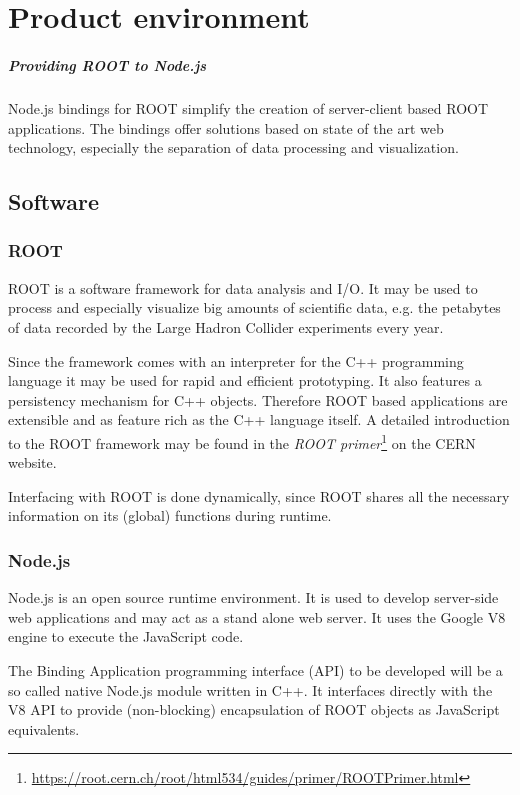 \chapter{Product environment}

\paragraph{Providing ROOT to Node.js}
Node.js bindings for ROOT simplify the creation of server-client based ROOT applications. The bindings offer solutions based on state of the art web technology, especially the separation of data 
processing and visualization.\\

\section{Software}
\subsection{ROOT}

ROOT is a software framework for data analysis and I/O. It may be used to process and especially visualize big amounts of scientific data, e.g. the petabytes of data recorded by the Large Hadron Collider experiments every year.\par
Since the framework comes with an interpreter for the C++ programming language it may be used for rapid and efficient prototyping. It also features a persistency mechanism for C++ objects. Therefore ROOT based applications are extensible and as feature rich as the C++ language itself.
A detailed introduction to the ROOT framework may be found in the \textit{ROOT  primer}\footnote[1]{\url{https://root.cern.ch/root/html534/guides/primer/ROOTPrimer.html}}
on the CERN website. \par
Interfacing with ROOT is done dynamically, since ROOT shares all the necessary information on its (global) functions during runtime.

\subsection{Node.js}

Node.js is an open source runtime environment. It is used to develop server-side web applications and may act as a stand alone web server. It uses the Google V8 engine to execute the JavaScript code. \par
The Binding Application programming interface (API) to be developed will be a so called native Node.js module written in C++. It interfaces directly with the V8 API to provide (non-blocking) encapsulation of ROOT objects as JavaScript equivalents.

